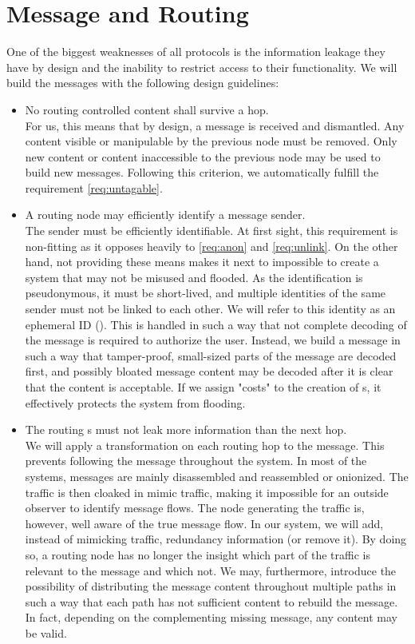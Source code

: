 \section{Message and Routing}
One of the biggest weaknesses of all protocols is the information leakage they have by design and the inability to restrict access to their functionality. We will build the messages with the following design guidelines:
\begin{itemize}
	\item No routing controlled content shall survive a hop.\\
	For us, this means that by design, a message is received and dismantled. Any content visible or manipulable by the previous node must be removed. Only new content or content inaccessible to the previous node may be used to build new messages. Following this criterion, we automatically fulfill the requirement \ref{req:untagable}.
	\item A routing node may efficiently identify a message sender.\\      
	The sender must be efficiently identifiable. At first sight, this requirement is non-fitting as it opposes heavily to \ref{req:anon} and \ref{req:unlink}. On the other hand, not providing these means makes it next to impossible to create a system that may not be misused and flooded. As the identification is pseudonymous, it must be short-lived, and multiple identities of the same sender must not be linked to each other. We will refer to this identity as an ephemeral ID (). This  is handled in such a way that not complete decoding of the message is required to authorize the user. Instead, we build a message in such a way that tamper-proof, small-sized parts of the message are decoded first, and possibly bloated message content may be decoded after it is clear that the content is acceptable. If we assign "costs" to the creation of s, it effectively protects the system from flooding.
	\item The routing s must not leak more information than the next hop.\\
	We will apply a transformation on each routing hop to the message. This prevents following the message throughout the system. In most of the systems, messages are mainly disassembled and reassembled or onionized. The traffic is then cloaked in mimic traffic, making it impossible for an outside observer to identify message flows. The node generating the traffic is, however, well aware of the true message flow. In our system, we will add, instead of mimicking traffic, redundancy information (or remove it). By doing so, a routing node has no longer the insight which part of the traffic is relevant to the message and which not. We may, furthermore, introduce the possibility of distributing the message content throughout multiple paths in such a way that each path has not sufficient content to rebuild the message. In fact, depending on the complementing missing message, any content may be valid. 

\end{itemize}
